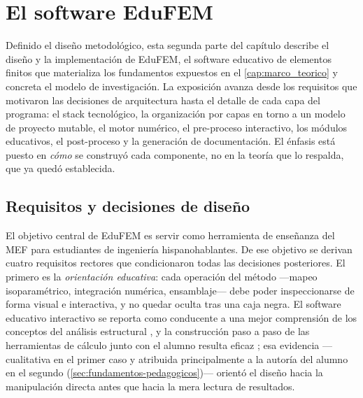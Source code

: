 \section{El software EduFEM}
\label{sec:diseno-edufem}

Definido el diseño metodológico, esta segunda parte del capítulo describe el diseño y la implementación de EduFEM, el software educativo de elementos finitos que materializa los fundamentos expuestos en el \autoref{cap:marco_teorico} y concreta el modelo de investigación. La exposición avanza desde los requisitos que motivaron las decisiones de arquitectura hasta el detalle de cada capa del programa: el stack tecnológico, la organización por capas en torno a un modelo de proyecto mutable, el motor numérico, el pre-proceso interactivo, los módulos educativos, el post-proceso y la generación de documentación. El énfasis está puesto en \emph{cómo} se construyó cada componente, no en la teoría que lo respalda, que ya quedó establecida.

\subsection{Requisitos y decisiones de diseño}
\label{sec:requisitos}

El objetivo central de EduFEM es servir como herramienta de enseñanza del MEF para estudiantes de ingeniería hispanohablantes. De ese objetivo se derivan cuatro requisitos rectores que condicionaron todas las decisiones posteriores. El primero es la \emph{orientación educativa}: cada operación del método —mapeo isoparamétrico, integración numérica, ensamblaje— debe poder inspeccionarse de forma visual e interactiva, y no quedar oculta tras una caja negra. El software educativo interactivo se reporta como conducente a una mejor comprensión de los conceptos del análisis estructural \autocite[p.~168]{lee2015interactive}, y la construcción paso a paso de las herramientas de cálculo junto con el alumno resulta eficaz \autocite[p.~17]{bishay2020teaching}; esa evidencia —cualitativa en el primer caso y atribuida principalmente a la autoría del alumno en el segundo (\autoref{sec:fundamentos-pedagogicos})— orientó el diseño hacia la manipulación directa antes que hacia la mera lectura de resultados.

